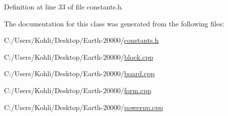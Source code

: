 Definition at line 33 of file constants.h.

The documentation for this class was generated from the following files:\begin{DoxyCompactItemize}
\item 
C:/Users/Kohli/Desktop/Earth-\/20000/\hyperlink{constants_8h}{constants.h}\item 
C:/Users/Kohli/Desktop/Earth-\/20000/\hyperlink{block_8cpp}{block.cpp}\item 
C:/Users/Kohli/Desktop/Earth-\/20000/\hyperlink{board_8cpp}{board.cpp}\item 
C:/Users/Kohli/Desktop/Earth-\/20000/\hyperlink{form_8cpp}{form.cpp}\item 
C:/Users/Kohli/Desktop/Earth-\/20000/\hyperlink{powerup_8cpp}{powerup.cpp}\end{DoxyCompactItemize}

